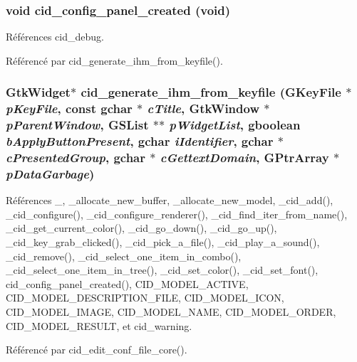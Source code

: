 \subsubsection{\setlength{\rightskip}{0pt plus 5cm}void cid\_\-config\_\-panel\_\-created (void)}\label{cid-conf-panel-factory_8c_0759c763f045e06e269a53cb1853a6f3}




Références cid\_\-debug.

Référencé par cid\_\-generate\_\-ihm\_\-from\_\-keyfile().
\subsubsection{\setlength{\rightskip}{0pt plus 5cm}GtkWidget$\ast$ cid\_\-generate\_\-ihm\_\-from\_\-keyfile (GKeyFile $\ast$ {\em pKeyFile}, \/  const gchar $\ast$ {\em cTitle}, \/  GtkWindow $\ast$ {\em pParentWindow}, \/  GSList $\ast$$\ast$ {\em pWidgetList}, \/  gboolean {\em bApplyButtonPresent}, \/  gchar {\em iIdentifier}, \/  gchar $\ast$ {\em cPresentedGroup}, \/  gchar $\ast$ {\em cGettextDomain}, \/  GPtrArray $\ast$ {\em pDataGarbage})}\label{cid-conf-panel-factory_8c_328a8204fa685a6187fc6a6422d1261b}




Références \_\-, \_\-allocate\_\-new\_\-buffer, \_\-allocate\_\-new\_\-model, \_\-cid\_\-add(), \_\-cid\_\-configure(), \_\-cid\_\-configure\_\-renderer(), \_\-cid\_\-find\_\-iter\_\-from\_\-name(), \_\-cid\_\-get\_\-current\_\-color(), \_\-cid\_\-go\_\-down(), \_\-cid\_\-go\_\-up(), \_\-cid\_\-key\_\-grab\_\-clicked(), \_\-cid\_\-pick\_\-a\_\-file(), \_\-cid\_\-play\_\-a\_\-sound(), \_\-cid\_\-remove(), \_\-cid\_\-select\_\-one\_\-item\_\-in\_\-combo(), \_\-cid\_\-select\_\-one\_\-item\_\-in\_\-tree(), \_\-cid\_\-set\_\-color(), \_\-cid\_\-set\_\-font(), cid\_\-config\_\-panel\_\-created(), CID\_\-MODEL\_\-ACTIVE, CID\_\-MODEL\_\-DESCRIPTION\_\-FILE, CID\_\-MODEL\_\-ICON, CID\_\-MODEL\_\-IMAGE, CID\_\-MODEL\_\-NAME, CID\_\-MODEL\_\-ORDER, CID\_\-MODEL\_\-RESULT, et cid\_\-warning.

Référencé par cid\_\-edit\_\-conf\_\-file\_\-core().